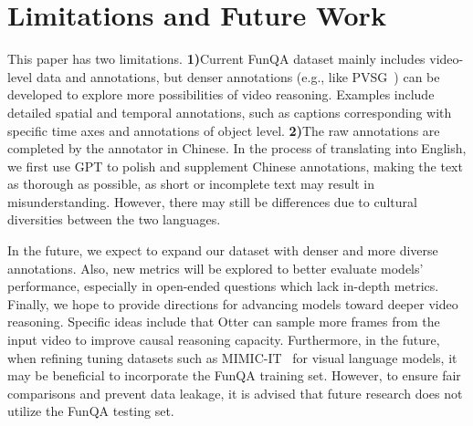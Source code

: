 \section{Limitations and Future Work}
This paper has two limitations. \textbf{1)}\quad Current FunQA dataset mainly includes video-level data and annotations, but denser annotations (e.g., like PVSG~\cite{yang2023panoptic}) can be developed to explore more possibilities of video reasoning. Examples include detailed spatial and temporal annotations, such as captions corresponding with specific time axes and annotations of object level. \textbf{2)}\quad The raw annotations are completed by the annotator in Chinese. In the process of translating into English, we first use GPT to polish and supplement Chinese annotations, making the text as thorough as possible, as short or incomplete text may result in misunderstanding. However, there may still be differences due to cultural diversities between the two languages.

In the future, we expect to expand our dataset with denser and more diverse annotations. Also, new metrics will be explored to better evaluate models' performance, especially in open-ended questions which lack in-depth metrics. Finally, we hope to provide directions for advancing models toward deeper video reasoning. Specific ideas include that Otter can sample more frames from the input video to improve causal reasoning capacity. Furthermore, in the future, when refining tuning datasets such as MIMIC-IT~\cite{li2023mimic} for visual language models, it may be beneficial to incorporate the FunQA training set. However, to ensure fair comparisons and prevent data leakage, it is advised that future research does not utilize the FunQA testing set.